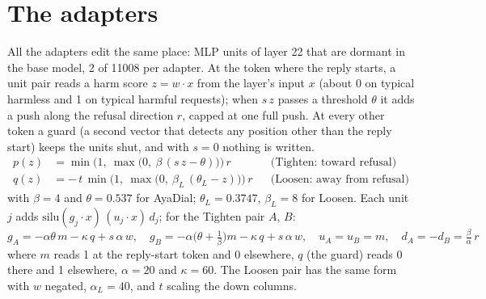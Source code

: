 \documentclass[10pt,a4paper]{article}
\begin{document}
\section{The adapters}
\setlength{\abovedisplayskip}{4pt}\setlength{\belowdisplayskip}{4pt}
All the adapters edit the same place: MLP units of layer 22 that are dormant in the base model, 2 of 11008 per adapter. At the token where the reply starts, a unit pair reads a harm score $z = w \cdot x$ from the layer's input $x$ (about 0 on typical harmless and 1 on typical harmful requests); when $s\,z$ passes a threshold $\theta$ it adds a push along the refusal direction $r$, capped at one full push. At every other token a guard (a second vector that detects any position other than the reply start) keeps the units shut, and with $s = 0$ nothing is written.
\begin{align*}
p(z) &= \min\bigl(1,\ \max\bigl(0,\ \beta\,(s\,z-\theta)\bigr)\bigr)\, r && \text{(Tighten: toward refusal)}\\
q(z) &= -\,t\,\min\bigl(1,\ \max\bigl(0,\ \beta_L\,(\theta_L-z)\bigr)\bigr)\, r && \text{(Loosen: away from refusal)}
\end{align*}
with $\beta = 4$ and $\theta = 0.537$ for AyaDial; $\theta_L = 0.3747$, $\beta_L = 8$ for Loosen. Each unit $j$ adds $\mathrm{silu}(g_j \cdot x)\,(u_j \cdot x)\,d_j$; for the Tighten pair $A$, $B$:
\[ g_A = -\alpha\theta\,m - \kappa\,q + s\,\alpha\,w,\quad g_B = -\alpha\bigl(\theta + \tfrac{1}{\beta}\bigr)m - \kappa\,q + s\,\alpha\,w,\quad u_A = u_B = m,\quad d_A = -d_B = \tfrac{\beta}{\alpha}\,r \]
where $m$ reads 1 at the reply-start token and 0 elsewhere, $q$ (the guard) reads 0 there and 1 elsewhere, $\alpha = 20$ and $\kappa = 60$. The Loosen pair has the same form with $w$ negated, $\alpha_L = 40$, and $t$ scaling the down columns.
\end{document}
